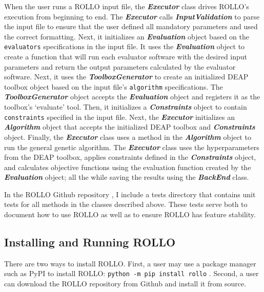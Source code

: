 When the user runs a \gls{ROLLO} input file, the \textbf{\textit{Executor}} class 
drives \gls{ROLLO}'s execution from beginning to end.
The \textbf{\textit{Executor}} calls \textbf{\textit{InputValidation}} to 
parse the input file to ensure that the user defined all mandatory parameters
and used the correct formatting.
Next, it initializes an \textbf{\textit{Evaluation}} object based on the 
\texttt{evaluators} specifications in the input file. 
It uses the \textbf{\textit{Evaluation}} object to create a function that will 
run each evaluator software with the desired input parameters and return the 
output parameters calculated by the evaluator software. 
Next, it uses the \textbf{\textit{ToolboxGenerator}} to create an initialized 
DEAP toolbox object based on the input file's \texttt{algorithm} specifications. 
The \textbf{\textit{ToolboxGenerator}} object accepts the 
\textbf{\textit{Evaluation}} object and registers it as the toolbox's `evaluate' 
tool.  
Then, it initializes a \textbf{\textit{Constraints}} object to contain 
\texttt{constraints} specified in the input file. 
Next, the \textbf{\textit{Executor}} initializes an \textbf{\textit{Algorithm}} 
object that accepts the initialized \gls{DEAP} toolbox and \textbf{\textit{Constraints}} 
object. 
Finally, the \textbf{\textit{Executor}} class uses a method in the 
\textbf{\textit{Algorithm}} object to run the general genetic algorithm. 
The \textbf{\textit{Executor}} class uses the hyperparameters from the \gls{DEAP} 
toolbox, applies constraints defined in the \textbf{\textit{Constraints}} object, 
and calculates objective functions using the evaluation function created by the 
\textbf{\textit{Evaluation}} object; all the while saving the results using the 
\textbf{\textit{BackEnd}} class. 

In the \gls{ROLLO} Github repository \cite{chee_rollo_2021}, I include a tests 
directory that contains unit tests for all methods in the classes described 
above. %
These tests serve both to document how to use \gls{ROLLO} as well as to ensure 
\gls{ROLLO} has feature stability. 

\subsection{Installing and Running ROLLO}
There are two ways to install \gls{ROLLO}.
First, a user may use a package manager such as \gls{PyPI} to install \gls{ROLLO}: 
\texttt{python -m pip install rollo} \cite{chee_rollo_2021}.
Second, a user can download the \gls{ROLLO} repository \cite{chee_rollo_2021}
from Github and install it from source. 

